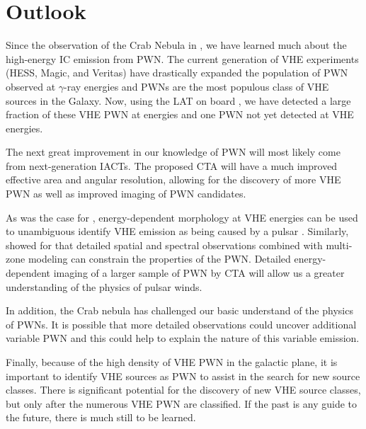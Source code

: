 \chapter{Outlook}

Since the observation of the Crab Nebula
in \citeyear{weekes_1989a_observation-gamma}
\citep{weekes_1989a_observation-gamma}, we have learned much about the
high-energy \ac{IC} emission from \ac{PWN}. The current generation of
\ac{VHE} experiments (\ac{HESS}, Magic, and Veritas) have drastically
expanded the population of \ac{PWN} observed at $\gamma$-ray energies and
\acp{PWN} are the most populous class of \ac{VHE} sources in the Galaxy.
Now, using the \ac{LAT} on board \fermi, we have detected a large
fraction of these \ac{VHE} \ac{PWN} at \gev energies and one \ac{PWN}
not yet detected at \ac{VHE} energies.

The next great improvement in our knowledge of \ac{PWN} will most
likely come from next-generation \acp{IACT}. The proposed \ac{CTA}
\citep{actis_2011a_design-concepts} will have a much improved effective
area and angular resolution, allowing for the discovery of more \ac{VHE}
\ac{PWN} as well as improved imaging of \ac{PWN} candidates.

As was the case for , energy-dependent morphology at \ac{VHE}
energies can be used to unambiguous identify \ac{VHE} emission as being
caused by a pulsar \citep{aharonian_2006a_energy-dependent}.  Similarly,
\cite{van-etten_2011a_multi-zone-modeling} showed for  that
detailed spatial and spectral observations combined with multi-zone
modeling can constrain the properties of the \ac{PWN}.  Detailed
energy-dependent imaging of a larger sample of \ac{PWN} by \ac{CTA}
will allow us a greater understanding of the physics of pulsar winds.

In addition, the Crab nebula has challenged our basic understand of the
physics of \acp{PWN}. It is possible that more detailed observations could
uncover additional variable \ac{PWN} and this could help to explain the
nature of this variable emission.

Finally, because of the high density of \ac{VHE} \ac{PWN} in the galactic
plane, it is important to identify \ac{VHE} sources as \ac{PWN} to assist
in the search for new source classes.  There is significant potential
for the discovery of new \ac{VHE} source classes, but only after the
numerous \ac{VHE} \ac{PWN} are classified.  If the past is any guide to
the future, there is much still to be learned.
